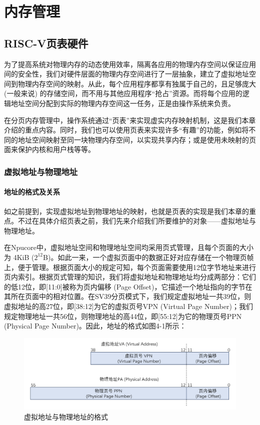 \chapter{内存管理}
\section{RISC-V页表硬件}

为了提高系统对物理内存的动态使用效率，隔离各应用的物理内存空间以保证应用间的安全性，我们对硬件层面的物理内存空间进行了一层抽象，建立了虚拟地址空间到物理内存空间的映射。从此，每个应用程序都享有独属于自己的，且足够庞大 (一般来说) 的存储空间，而不用与其他应用程序“抢占”资源。而将每个应用的逻辑地址空间分配到实际的物理内存空间这一任务，正是由操作系统来负责。

在分页内存管理中，操作系统通过“页表”来实现虚实内存映射机制，这是我们本章介绍的重点内容。同时，我们也可以使用页表来实现许多“有趣”的功能，例如将不同的地址空间映射至同一块物理内存空间，以实现共享内存；或是使用未映射的页面来保护内核和用户栈等等。

\subsection{虚拟地址与物理地址}

\subsubsection{地址的格式及关系}

如之前提到，实现虚拟地址到物理地址的映射，也就是页表的实现是我们本章的重点。不过在具体介绍页表之前，我们先来介绍我们所要维护的对象——虚拟地址与物理地址。

在Npucore中，虚拟地址空间和物理地址空间均采用页式管理，且每个页面的大小为 4KiB ($2^{12}$B)。如此一来，一个虚拟页面中的数据正好对应存储在一个物理页帧上，便于管理。根据页面大小的规定可知，每个页面需要使用12位字节地址来进行页内索引。根据页式管理的知识，我们将虚拟地址和物理地址均分成两部分：它们的低12位，即[11:0]被称为页内偏移 (Page Offset)，它描述一个地址指向的字节在其所在页面中的相对位置。在SV39分页模式下，我们规定虚拟地址一共39位，则虚拟地址的高27位，即[38:12]为它的虚拟页号VPN (Virtual Page Number)；我们规定物理地址一共56位，则物理地址的高44位，即[55:12]为它的物理页号PPN (Physical Page Number)。因此，地址的格式如图4-1所示：

\begin{figure}[h]
	\centering
	\includegraphics[width=.80\textwidth]{figures/04-01-虚拟地址与物理地址的格式.png}
	\caption{虚拟地址与物理地址的格式}
\end{figure}\FloatBarrier

